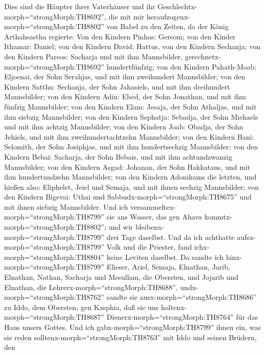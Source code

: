  Dies sind die Häupter ihrer Vaterhäuser und ihr
Geschlechtx-morph=``strongMorph:TH8692'', die mit mir
heraufzogenx-morph=``strongMorph:TH8802'' von Babel zu den Zeiten, da
der König Arthahsastha regierte:  Von den Kindern Pinhas:
Gersom; von den Kinder Ithamar: Daniel; von den Kindern David: Hattus,
 von den Kindern Sechanja; von den Kindern Pareos: Sacharja
und mit ihm Mannsbilder, gerechnetx-morph=``strongMorph:TH8692''
hundertfünfzig;  von den Kindern Pahath-Moab: Eljoenai, der
Sohn Serahjas, und mit ihm zweihundert Mannsbilder;  von den
Kindern Satthu: Sechanja, der Sohn Jahasiels, und mit ihm dreihundert
Mannsbilder;  von den Kindern Adin: Ebed, der Sohn Jonathan,
und mit ihm fünfzig Mannsbilder;  von den Kindern Elam:
Jesaja, der Sohn Athaljas, und mit ihm siebzig Mannsbilder; 
von den Kindern Sephatja: Sebadja, der Sohn Michaels und mit ihm achtzig
Mannsbilder;  von den Kindern Joab: Obadja, der Sohn
Jehiels, und mit ihm zweihundertachtzehn Mannsbilder;  von
den Kindern Bani: Selomith, der Sohn Josiphjas, und mit ihm
hundertsechzig Mannsbilder;  von den Kindern Bebai:
Sacharja, der Sohn Bebais, und mit ihm achtundzwanzig Mannsbilder;
 von den Kindern Asgad: Johanan, der Sohn Hakkatans, und
mit ihm hundertundzehn Mannsbilder;  von den Kindern
Adonikams die letzten, und hießen also: Eliphelet, Jeiel und Semaja, und
mit ihnen sechzig Mannsbilder;  von den Kindern Bigevai:
Uthai und Sabbudx-morph=``strongMorph:TH8675'' und mit ihnen siebzig
Mannsbilder.  Und ich
versammeltex-morph=``strongMorph:TH8799'' sie ans Wasser, das gen Ahava
kommtx-morph=``strongMorph:TH8802''; und wir
bleibenx-morph=``strongMorph:TH8799'' drei Tage daselbst. Und da ich
achthatte aufsx-morph=``strongMorph:TH8799'' Volk und die Priester, fand
ichx-morph=``strongMorph:TH8804'' keine Leviten daselbst. 
Da sandte ich hinx-morph=``strongMorph:TH8799'' Elieser, Ariel, Semaja,
Elnathan, Jarib, Elnathan, Nathan, Sacharja und Mesullam, die Obersten,
und Jojarib und Elnathan, die Lehrerx-morph=``strongMorph:TH8688'',
 undx-morph=``strongMorph:TH8762'' sandte sie
ausx-morph=``strongMorph:TH8686'' zu Iddo, dem Obersten, gen Kasphia,
daß sie uns holtenx-morph=``strongMorph:TH8687''
Dienerx-morph=``strongMorph:TH8764'' für das Haus unsers Gottes. Und ich
gabx-morph=``strongMorph:TH8799'' ihnen ein, was sie reden
solltenx-morph=``strongMorph:TH8763'' mit Iddo und seinen Brüdern, den
